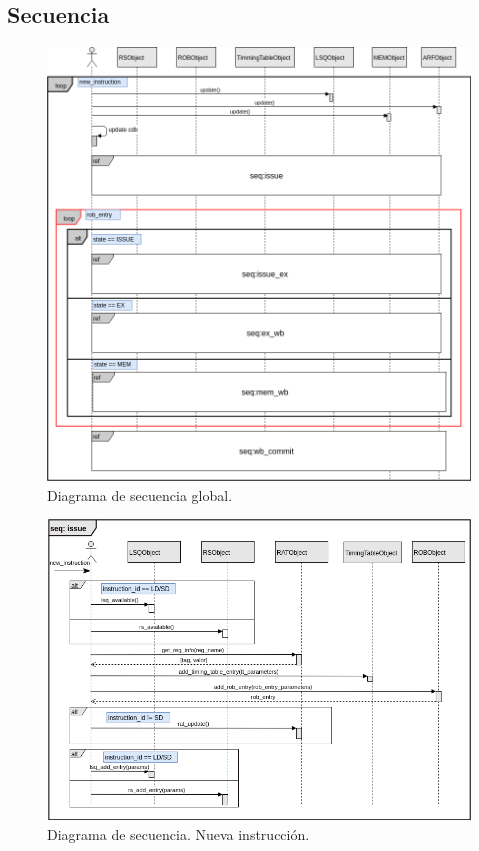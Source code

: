 \documentclass[a4paper]{article}
\begin{document}
	\subsection*{Secuencia}

	\begin{figure}[H]
		\centering
		\includegraphics[width=1\textwidth]{figures/main.png}
		\caption{\label{fig:main}Diagrama de secuencia global.}
	\end{figure}

	\begin{figure}[H]
		\centering
		\includegraphics[width=1\textwidth]{figures/sec_issue.png}
		\caption{\label{fig:sec_issue}Diagrama de secuencia. Nueva instrucción.}
	\end{figure}
\end{document}
